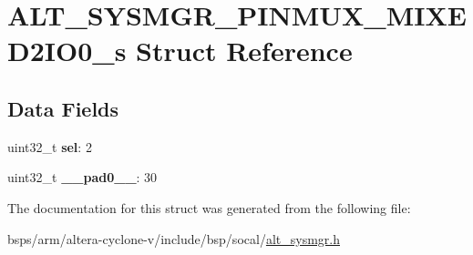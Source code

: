 \hypertarget{structALT__SYSMGR__PINMUX__MIXED2IO0__s}{}\section{A\+L\+T\+\_\+\+S\+Y\+S\+M\+G\+R\+\_\+\+P\+I\+N\+M\+U\+X\+\_\+\+M\+I\+X\+E\+D2\+I\+O0\+\_\+s Struct Reference}
\label{structALT__SYSMGR__PINMUX__MIXED2IO0__s}
\subsection*{Data Fields}
\begin{DoxyCompactItemize}
\item 
\mbox{\label{structALT__SYSMGR__PINMUX__MIXED2IO0__s_a2ffe0c041534c6e748205965c697bdb7}} 
uint32\+\_\+t {\bfseries sel}\+: 2
\item 
\mbox{\label{structALT__SYSMGR__PINMUX__MIXED2IO0__s_ace6bf249be46c102aae2609960211512}} 
uint32\+\_\+t {\bfseries \+\_\+\+\_\+pad0\+\_\+\+\_\+}\+: 30
\end{DoxyCompactItemize}


The documentation for this struct was generated from the following file\+:\begin{DoxyCompactItemize}
\item 
bsps/arm/altera-\/cyclone-\/v/include/bsp/socal/\mbox{\hyperlink{alt__sysmgr_8h}{alt\+\_\+sysmgr.\+h}}\end{DoxyCompactItemize}

